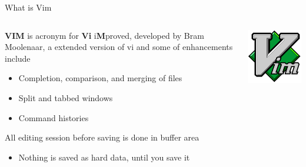 \documentclass[newPxFont,sthlmFooter,nooffset]{beamer}
\begin{document}
\begin{frame}[t]{What is Vim}
\begin{columns}
\begin{column}{0.8\linewidth}
\textbf{VIM} is acronym for \textbf{Vi} i\textbf{M}proved, developed by Bram Moolenaar, a extended version of vi and some of enhancements include
\begin{itemize}
\item Completion, comparison, and merging of files
\item Split and tabbed windows
\item Command histories
\end{itemize}
\bigskip
All editing session before saving is done in buffer area
\begin{itemize}
\item Nothing is saved as hard data, until you save it
\end{itemize}
\end{column}
\begin{column}{0.2\linewidth}
  \includegraphics[width=0.8\linewidth]{./figure/vim_logo.png}
\end{column}
\end{columns}
\end{frame}
\end{document}
